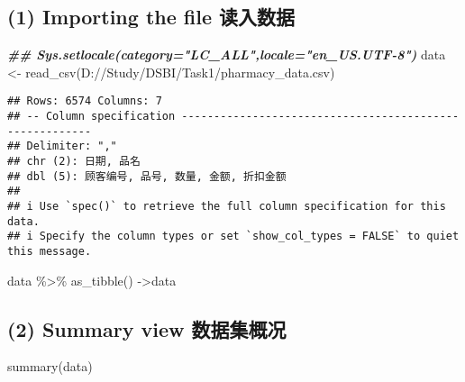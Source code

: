 \documentclass[
]{article}
\newenvironment{Shaded}{\begin{snugshade}}{\end{snugshade}}
\newcommand{\DocumentationTok}[1]{\textcolor[rgb]{0.56,0.35,0.01}{\textbf{\textit{#1}}}}
\newcommand{\FunctionTok}[1]{\textcolor[rgb]{0.00,0.00,0.00}{#1}}
\newcommand{\NormalTok}[1]{#1}
\newcommand{\OtherTok}[1]{\textcolor[rgb]{0.56,0.35,0.01}{#1}}
\newcommand{\SpecialCharTok}[1]{\textcolor[rgb]{0.00,0.00,0.00}{#1}}
\newcommand{\StringTok}[1]{\textcolor[rgb]{0.31,0.60,0.02}{#1}}
\begin{document}
\hypertarget{importing-the-file-ux8bfbux5165ux6570ux636e}{%
\subsection{(1) Importing the file
读入数据}\label{importing-the-file-ux8bfbux5165ux6570ux636e}}

\begin{Shaded}
\begin{Highlighting}[]
\DocumentationTok{\#\# Sys.setlocale(category="LC\_ALL",locale="en\_US.UTF{-}8")}
\NormalTok{data }\OtherTok{\textless{}{-}} \FunctionTok{read\_csv}\NormalTok{(}\StringTok{\textquotesingle{}D://Study/DSBI/Task1/pharmacy\_data.csv\textquotesingle{}}\NormalTok{)}
\end{Highlighting}
\end{Shaded}

\begin{verbatim}
## Rows: 6574 Columns: 7
## -- Column specification --------------------------------------------------------
## Delimiter: ","
## chr (2): 日期, 品名
## dbl (5): 顾客编号, 品号, 数量, 金额, 折扣金额
## 
## i Use `spec()` to retrieve the full column specification for this data.
## i Specify the column types or set `show_col_types = FALSE` to quiet this message.
\end{verbatim}

\begin{Shaded}
\begin{Highlighting}[]
\NormalTok{data }\SpecialCharTok{\%\textgreater{}\%} \FunctionTok{as\_tibble}\NormalTok{() }\OtherTok{{-}\textgreater{}}\NormalTok{data}
\end{Highlighting}
\end{Shaded}

\hypertarget{summary-view-ux6570ux636eux96c6ux6982ux51b5}{%
\subsection{(2) Summary view
数据集概况}\label{summary-view-ux6570ux636eux96c6ux6982ux51b5}}

\begin{Shaded}
\begin{Highlighting}[]
\FunctionTok{summary}\NormalTok{(data)}
\end{Highlighting}
\end{Shaded}
\end{document}
